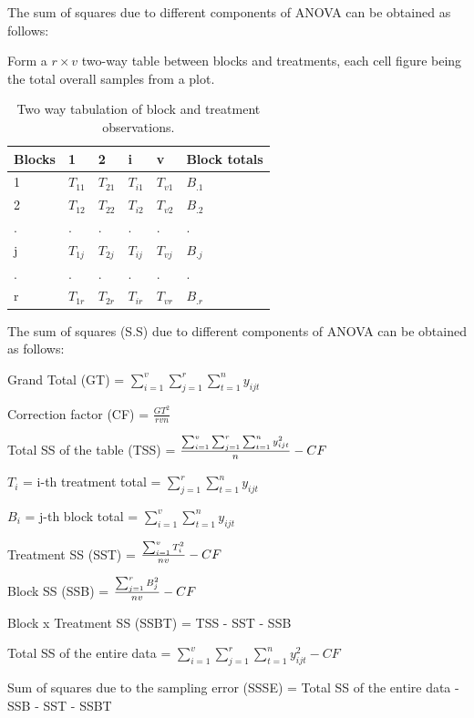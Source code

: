 \documentclass[
  ignorenonframetext,
  aspectratio=169]{beamer}
\begin{document}
\begin{frame}{}
\protect\hypertarget{section-8}{}
\small

The sum of squares due to different components of ANOVA can be obtained
as follows:

Form a \(r \times v\) two-way table between blocks and treatments, each
cell figure being the total overall samples from a plot.

\begin{table}

\caption{\label{tab:two-way-block-treatment}Two way tabulation of block and treatment observations.}
\centering
\fontsize{8}{10}\selectfont
\begin{tabular}[t]{llllll}
\toprule
Blocks & 1 & 2 & i & v & Block totals\\
\midrule
1 & $T_{11}$ & $T_{21}$ & $T_{i1}$ & $T_{v1}$ & $B_{.1}$\\
2 & $T_{12}$ & $T_{22}$ & $T_{i2}$ & $T_{v2}$ & $B_{.2}$\\
. & . & . & . & . & .\\
j & $T_{1j}$ & $T_{2j}$ & $T_{ij}$ & $T_{vj}$ & $B_{.j}$\\
. & . & . & . & . & .\\
\addlinespace
r & $T_{1r}$ & $T_{2r}$ & $T_{ir}$ & $T_{vr}$ & $B_{.r}$\\
\bottomrule
\end{tabular}
\end{table}
\end{frame}

\begin{frame}{}
\protect\hypertarget{section-9}{}
\small

The sum of squares (S.S) due to different components of ANOVA can be
obtained as follows:

Grand Total (GT) =
\(\sum_{i = 1}^v \sum_{j = 1}^r \sum_{t = 1}^n y_{ijt}\)

Correction factor (CF) = \(\frac{GT^2}{rvn}\)

Total SS of the table (TSS) =
\(\large \frac{\sum_{i = 1}^v \sum_{j = 1}^r \sum_{t = 1}^n y_{ijt}^2}{n} - CF\)

\(T_i\) = i-th treatment total =
\(\sum_{j = 1}^r \sum_{t = 1}^n y_{ijt}\)

\(B_i\) = j-th block total = \(\sum_{i = 1}^v \sum_{t = 1}^n y_{ijt}\)

Treatment SS (SST) = \(\large \frac{\sum_{i = 1}^v T_i^2}{nv} - CF\)

Block SS (SSB) = \(\large \frac{\sum_{j = 1}^r B_j^2}{nv} - CF\)

Block x Treatment SS (SSBT) = TSS - SST - SSB

Total SS of the entire data =
\(\sum_{i = 1}^v \sum_{j = 1}^r \sum_{t = 1}^n y_{ijt}^2 - CF\)

Sum of squares due to the sampling error (SSSE) = Total SS of the entire
data - SSB - SST - SSBT
\end{frame}
\end{document}
